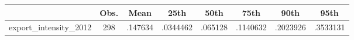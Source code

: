 {
\def\sym#1{\ifmmode^{#1}\else\(^{#1}\)\fi}
\begin{tabular}{l*{1}{ccccccc}}
\toprule
                    &        Obs.&        Mean&        25th&        50th&        75th&        90th&        95th\\
\midrule
export\_intensity\_2012&         298&     .147634&    .0344462&     .065128&    .1140632&    .2023926&    .3533131\\
\bottomrule
\end{tabular}
}
